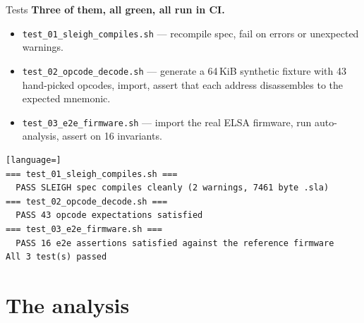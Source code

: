 \documentclass[aspectratio=169,11pt]{beamer}
\begin{document}
\begin{frame}[fragile]{Tests}
\textbf{Three of them, all green, all run in CI.}
\begin{itemize}
  \item \texttt{test\_01\_sleigh\_compiles.sh} --- recompile spec,
        fail on errors or unexpected warnings.
  \item \texttt{test\_02\_opcode\_decode.sh} --- generate a 64\,KiB
        synthetic fixture with 43 hand-picked opcodes, import,
        assert that each address disassembles to the expected mnemonic.
  \item \texttt{test\_03\_e2e\_firmware.sh} --- import the real ELSA
        firmware, run auto-analysis, assert on 16 invariants.
\end{itemize}
\begin{lstlisting}[language=]
=== test_01_sleigh_compiles.sh ===
  PASS SLEIGH spec compiles cleanly (2 warnings, 7461 byte .sla)
=== test_02_opcode_decode.sh ===
  PASS 43 opcode expectations satisfied
=== test_03_e2e_firmware.sh ===
  PASS 16 e2e assertions satisfied against the reference firmware
All 3 test(s) passed
\end{lstlisting}
\end{frame}

\section{The analysis}
\end{document}
